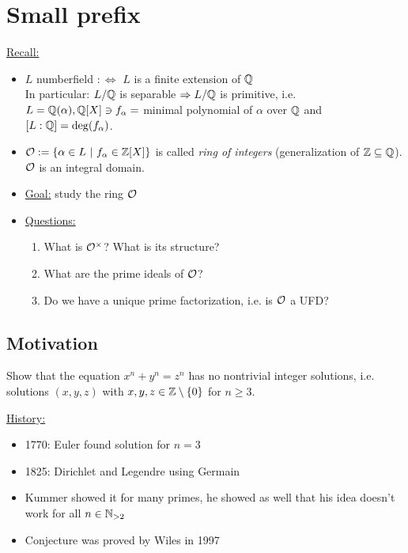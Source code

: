 
\chapter{Small prefix}

\underline{Recall:}
\begin{itemize}
\item $L$ numberfield $:\iff$ $L$ is a finite extension of $\mathbb{Q}$\\
In particular: $L / \mathbb{Q}$ is separable $\Rightarrow L/\mathbb{Q}$ is primitive, i.e. $L=\mathbb{Q}(\alpha), \mathbb{Q}[X] \ni f_\alpha=$ minimal polynomial of $\alpha$ over $\mathbb{Q}$ and $[L:\mathbb{Q}]=\deg(f_\alpha)$.
\item $\mathcal{O}:=\{\alpha \in L \ | \ f_\alpha \in \mathbb{Z}[X]\}$ is called \emph{ring of integers} (generalization of $\mathbb{Z} \subseteq \mathbb{Q}$).\\
$\mathcal{O}$ is an integral domain.
\item \underline{Goal:} study the ring $\mathcal{O}$
\item \underline{Questions:} \begin{enumerate}
\item What is $\mathcal{O}^\times$? What is its structure?
\item What are the prime ideals of $\mathcal{O}$?
\item Do we have a unique prime factorization, i.e. is $\mathcal{O}$ a UFD?
\end{enumerate}
\end{itemize}

\section{Motivation}
\begin{prob}
Show that the equation $x^n+y^n=z^n$ has no nontrivial integer solutions, i.e. solutions $(x,y,z)$ with $x,y,z \in \mathbb{Z}\setminus \{0\}$ for $n \geq 3$.
\end{prob}
\underline{History:} \begin{itemize}
\item 1770: Euler found solution for $n=3$
\item 1825: Dirichlet and Legendre using Germain 
\item Kummer showed it for many primes, he showed as well that his idea doesn't work for all $n \in \mathbb{N}_{>2}$
\item Conjecture was proved by Wiles in 1997
\end{itemize}

